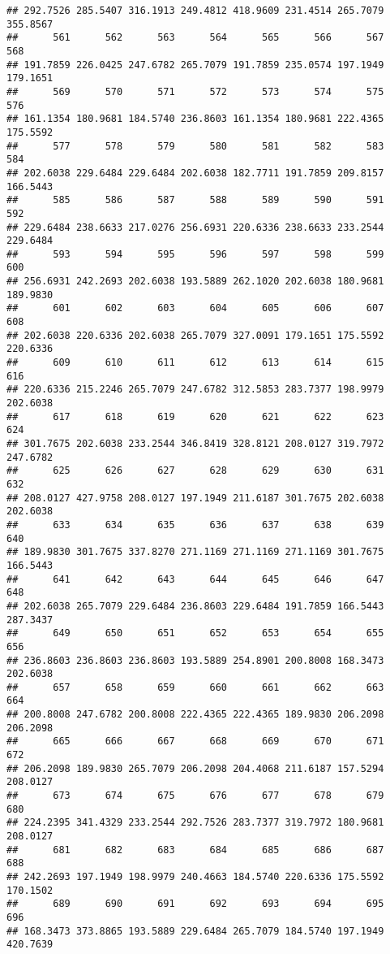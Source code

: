 \documentclass[
]{article}
\begin{document}
\begin{verbatim}
## 292.7526 285.5407 316.1913 249.4812 418.9609 231.4514 265.7079 355.8567 
##      561      562      563      564      565      566      567      568 
## 191.7859 226.0425 247.6782 265.7079 191.7859 235.0574 197.1949 179.1651 
##      569      570      571      572      573      574      575      576 
## 161.1354 180.9681 184.5740 236.8603 161.1354 180.9681 222.4365 175.5592 
##      577      578      579      580      581      582      583      584 
## 202.6038 229.6484 229.6484 202.6038 182.7711 191.7859 209.8157 166.5443 
##      585      586      587      588      589      590      591      592 
## 229.6484 238.6633 217.0276 256.6931 220.6336 238.6633 233.2544 229.6484 
##      593      594      595      596      597      598      599      600 
## 256.6931 242.2693 202.6038 193.5889 262.1020 202.6038 180.9681 189.9830 
##      601      602      603      604      605      606      607      608 
## 202.6038 220.6336 202.6038 265.7079 327.0091 179.1651 175.5592 220.6336 
##      609      610      611      612      613      614      615      616 
## 220.6336 215.2246 265.7079 247.6782 312.5853 283.7377 198.9979 202.6038 
##      617      618      619      620      621      622      623      624 
## 301.7675 202.6038 233.2544 346.8419 328.8121 208.0127 319.7972 247.6782 
##      625      626      627      628      629      630      631      632 
## 208.0127 427.9758 208.0127 197.1949 211.6187 301.7675 202.6038 202.6038 
##      633      634      635      636      637      638      639      640 
## 189.9830 301.7675 337.8270 271.1169 271.1169 271.1169 301.7675 166.5443 
##      641      642      643      644      645      646      647      648 
## 202.6038 265.7079 229.6484 236.8603 229.6484 191.7859 166.5443 287.3437 
##      649      650      651      652      653      654      655      656 
## 236.8603 236.8603 236.8603 193.5889 254.8901 200.8008 168.3473 202.6038 
##      657      658      659      660      661      662      663      664 
## 200.8008 247.6782 200.8008 222.4365 222.4365 189.9830 206.2098 206.2098 
##      665      666      667      668      669      670      671      672 
## 206.2098 189.9830 265.7079 206.2098 204.4068 211.6187 157.5294 208.0127 
##      673      674      675      676      677      678      679      680 
## 224.2395 341.4329 233.2544 292.7526 283.7377 319.7972 180.9681 208.0127 
##      681      682      683      684      685      686      687      688 
## 242.2693 197.1949 198.9979 240.4663 184.5740 220.6336 175.5592 170.1502 
##      689      690      691      692      693      694      695      696 
## 168.3473 373.8865 193.5889 229.6484 265.7079 184.5740 197.1949 420.7639 

\end{verbatim}
\end{document}
